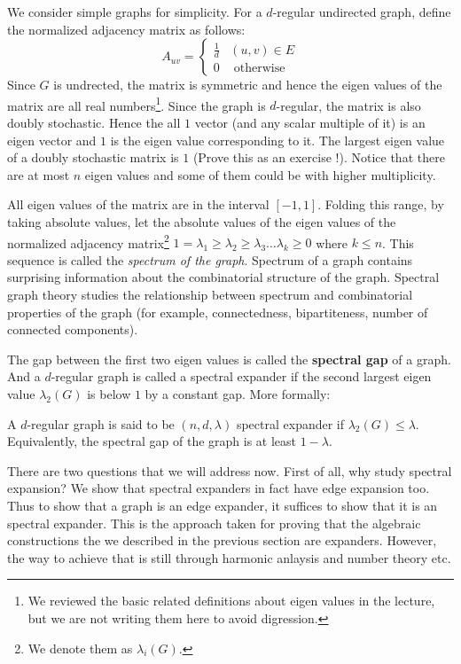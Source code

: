 We consider simple graphs for simplicity. For a $d$-regular undirected graph, define the normalized adjacency matrix as follows:
$$
A_{uv} = \left\{ \begin{array}{ll}
\frac{1}{d} & (u,v) \in E \\
0 & \textrm{ otherwise }
\end{array}
\right.
$$
Since $G$ is undrected, the matrix is symmetric and hence the eigen values of the matrix are all real numbers\footnote{We reviewed the basic related definitions about eigen values in the lecture, but we are not writing them here to avoid digression.}. Since the graph is $d$-regular, the matrix is also doubly stochastic. Hence the all $1$ vector (and any scalar multiple of it) is an eigen vector and $1$ is the eigen value corresponding to it. The largest eigen value of a doubly stochastic matrix is $1$ (Prove this as an exercise !). Notice that there are at most $n$ eigen values and some of them could be with higher multiplicity.

All eigen values of the matrix are in the interval $[-1,1]$. Folding this range, by taking absolute values, 
let the absolute values of the eigen values of the normalized adjacency matrix\footnote{We denote them as $\lambda_i(G)$.} $1=\lambda_1 \ge \lambda_2 \ge \lambda_3 \ldots \lambda_k \ge 0$ where $k \le n$. This sequence is called the {\em spectrum of the graph}. Spectrum of a graph contains surprising information about the combinatorial structure of the graph. Spectral graph theory studies the relationship between spectrum and combinatorial properties of the graph (for example, connectedness, bipartiteness, number of connected components).

The gap between the first two eigen values is called the \textbf{spectral gap} of a graph. And a $d$-regular graph is called a spectral expander if the second largest eigen value $\lambda_2(G)$ is below $1$ by a constant gap. More formally:

\begin{definition}
A $d$-regular graph is said to be $(n,d,\lambda)$ spectral expander if $\lambda_2(G) \le \lambda$. Equivalently, the spectral gap of the graph is at least $1-\lambda$.
\end{definition}

There are two questions that we will address now. First of all, why study spectral expansion? We show that spectral expanders in fact have edge expansion too. Thus to show that a graph is an edge expander, it suffices to show that it is an spectral expander. This is the approach taken for proving that the algebraic constructions the we described in the previous section are expanders. However, the way to achieve that is still through harmonic anlaysis and number theory etc.

